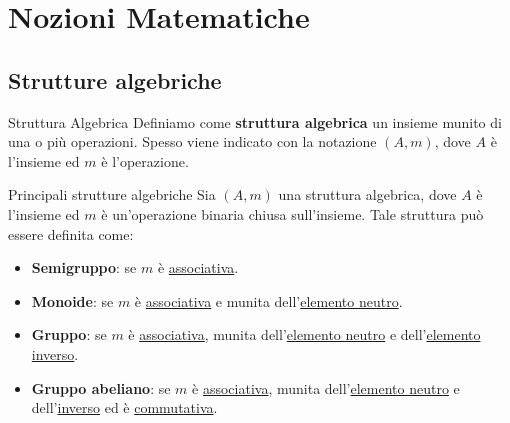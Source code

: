 
\section{Nozioni Matematiche}
\subsection{Strutture algebriche}
\begin{definition}{Struttura Algebrica}{}
    Definiamo come \textbf{struttura algebrica} un insieme munito di una o più operazioni. Spesso viene indicato con la notazione $(A, m)$, dove $A$ è l'insieme ed $m$ è l'operazione.
\end{definition}

\begin{definition}{Principali strutture algebriche}{}
    Sia $(A,m)$ una struttura algebrica, dove $A$ è l'insieme ed $m$ è un'operazione binaria chiusa sull'insieme. Tale struttura può essere definita come:
    \begin{itemize}
        \item \textbf{Semigruppo}: se $m$ è \underline{associativa}.
        \item \textbf{Monoide}: se $m$ è \underline{associativa} e munita dell'\underline{elemento neutro}.
        \item \textbf{Gruppo}: se $m$ è \underline{associativa}, munita dell'\underline{elemento neutro} e dell'\underline{elemento inverso}.
        \item \textbf{Gruppo abeliano}: se $m$ è \underline{associativa}, munita dell'\underline{elemento neutro} e dell'\underline{inverso} ed è \underline{commutativa}.
    \end{itemize}
\end{definition}

